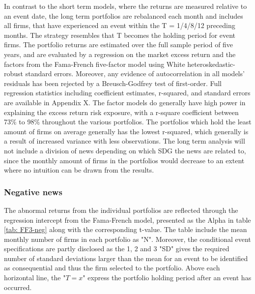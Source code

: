 In contrast to the short term models, where the returns are measured relative to an event date, the long term portfolios are rebalanced each month and includes all firms, that have experienced an event within the T = 1/4/8/12 preceding months. The strategy resembles that T becomes the holding period for event firms. The portfolio returns are estimated over the full sample period of five years, and are evaluated by a regression on the market excess return and the factors from the Fama-French \citeyear{Fama_french_3fac} five-factor model using White heteroskedastic-robust standard errors. Moreover, any evidence of autocorrelation in all models' residuals has been rejected by a Breusch-Godfrey test of first-order. Full regression statistics including coefficient estimates, r-squared, and standard errors are available in Appendix X.  The factor models do generally have high power in explaining the excess return risk exposure, with a r-square coefficient between 73\% to 98\% throughout the various portfolios. The portfolios which hold the least amount of firms on average generally has the lowest r-squared, which generally is a result of increased variance with less observations. The long term analysis will not include a division of news depending on which SDG the news are related to, since the monthly amount of firms in the portfolios would decrease to an extent where no intuition can be drawn from the results.   


\subsubsection{Negative news}

The abnormal returns from the individual portfolios are reflected through the regression intercept from the Fama-French model, presented as the Alpha in table \ref{tab: FF3-neg} along with the corresponding t-value. The table include the mean monthly number of firms in each portfolio as "N". Moreover, the conditional event specifications are partly disclosed as the 1, 2 and 3 "SD" gives the required number of standard deviations larger than the mean for an event to be identified as consequential and thus the firm selected to the portfolio. Above each horizontal line, the "$T = x$" express the portfolio holding period after an event has occurred. 


